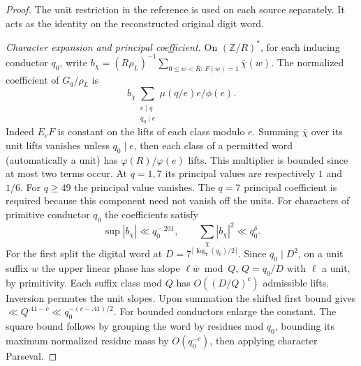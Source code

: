 \documentclass[11pt,a4paper]{article}
\theoremstyle{paperplain}
\numberwithin{equation}{section}
\begin{document}
\begin{proof}
The unit restriction in the reference is used on each source
separately. It acts as the identity on the reconstructed original digit word.

\par\smallskip\noindent\textit{Character expansion and principal coefficient.}  On \((\mathbb
Z/R)^*\), for each inducing conductor \(q_0\), write \(b_\chi=(R\rho_L)^{-1}\sum_{0\le
w<R:\,F(w)=1}\bar\chi(w)\). The normalized coefficient of \(G_q/\rho_L\) is
\[
 b_\chi\sum_{\substack{e\mid q\\q_0\mid e}}\mu(q/e)e/\phi(e).
\]
Indeed \(E_e F\) is constant on the lifts of each class modulo \(e\). Summing \(\bar\chi\) over
its unit lifts vanishes unless \(q_0\mid e\), then each class of a permitted word (automatically a
unit) has \(\varphi(R)/\varphi(e)\) lifts. This multiplier is bounded since at most two terms
occur. At \(q=1,7\) its principal values are respectively \(1\) and \(1/6\). For \(q\ge49\) the
principal value vanishes. The \(q=7\) principal coefficient is required because this component
need not vanish off the units. For characters of primitive conductor \(q_0\) the coefficients
satisfy
\[
 \sup |b_\chi|\ll q_0^{-.201},\qquad \sum_\chi |b_\chi|^2\ll q_0^\delta .
\]
For the first split the digital word at \(D=7^{\lceil\log_7(q_0)/2\rceil}\). Since \(q_0\mid
D^2\), on a unit suffix \(w\) the upper linear phase has slope \(\ell\bar w\bmod Q\), \(Q=q_0/D\)
with \(\ell\) a unit, by primitivity. Each suffix class mod \(Q\) has \(O((D/Q)^c)\) admissible
lifts. Inversion permutes the unit slopes. Upon summation the shifted first bound gives \(\ll
Q^{.41-c}\ll q_0^{-(c-.41)/2}\). For bounded conductors enlarge the constant. The square bound
follows by grouping the word by residues mod \(q_0\), bounding its maximum normalized residue mass
by \(O(q_0^{-c})\), then applying character Parseval.


\end{proof}
\end{document}
